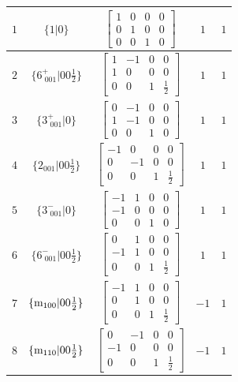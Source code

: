 \documentclass[fleqn,8pt]{jsarticle}
\begin{document}
\begin{longtable}{ccccc}
$ 1 $ & $ \{1|0\} $ & $ \begin{bmatrix} 1 & 0 & 0 & 0 \\ 0 & 1 & 0 & 0 \\ 0 & 0 & 1 & 0 \end{bmatrix} $ & $ 1 $ & $ 1 $ \\ \hline
$ 2 $ & $ \{6^{+}_{\,\,001}|0 0 \frac{1}{2}\} $ & $ \begin{bmatrix} 1 & -1 & 0 & 0 \\ 1 & 0 & 0 & 0 \\ 0 & 0 & 1 & \frac{1}{2} \end{bmatrix} $ & $ 1 $ & $ 1 $ \\ \hline
$ 3 $ & $ \{3^{+}_{\,\,001}|0\} $ & $ \begin{bmatrix} 0 & -1 & 0 & 0 \\ 1 & -1 & 0 & 0 \\ 0 & 0 & 1 & 0 \end{bmatrix} $ & $ 1 $ & $ 1 $ \\ \hline
$ 4 $ & $ \{2{}_{001}|0 0 \frac{1}{2}\} $ & $ \begin{bmatrix} -1 & 0 & 0 & 0 \\ 0 & -1 & 0 & 0 \\ 0 & 0 & 1 & \frac{1}{2} \end{bmatrix} $ & $ 1 $ & $ 1 $ \\ \hline
$ 5 $ & $ \{3^{-}_{\,\,001}|0\} $ & $ \begin{bmatrix} -1 & 1 & 0 & 0 \\ -1 & 0 & 0 & 0 \\ 0 & 0 & 1 & 0 \end{bmatrix} $ & $ 1 $ & $ 1 $ \\ \hline
$ 6 $ & $ \{6^{-}_{\,\,001}|0 0 \frac{1}{2}\} $ & $ \begin{bmatrix} 0 & 1 & 0 & 0 \\ -1 & 1 & 0 & 0 \\ 0 & 0 & 1 & \frac{1}{2} \end{bmatrix} $ & $ 1 $ & $ 1 $ \\ \hline
$ 7 $ & $ \{{\rm m}_{100}|0 0 \frac{1}{2}\} $ & $ \begin{bmatrix} -1 & 1 & 0 & 0 \\ 0 & 1 & 0 & 0 \\ 0 & 0 & 1 & \frac{1}{2} \end{bmatrix} $ & $ -1 $ & $ 1 $ \\ \hline
$ 8 $ & $ \{{\rm m}_{110}|0 0 \frac{1}{2}\} $ & $ \begin{bmatrix} 0 & -1 & 0 & 0 \\ -1 & 0 & 0 & 0 \\ 0 & 0 & 1 & \frac{1}{2} \end{bmatrix} $ & $ -1 $ & $ 1 $ \\ \hline

\end{longtable}
\end{document}
